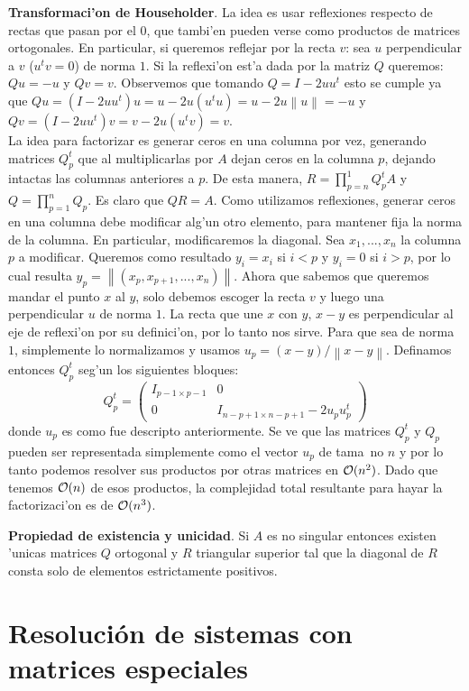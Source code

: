 \documentclass[a4paper,spanish]{article}
\newcommand{\norma}[1]{\left\|#1\right\|}
\newcommand{\Ode}[0]{{\cal O}}
\begin{document}
\textbf{Transformaci'on de Householder}. La idea es usar reflexiones respecto
de rectas que pasan por el $0$, que tambi'en pueden verse como productos de
matrices ortogonales. En particular, si queremos reflejar por la recta $v$:
sea $u$ perpendicular a $v$ ($u^tv = 0$) de norma $1$. Si la reflexi'on est'a
dada por la matriz $Q$ queremos: $Qu = -u$ y $Qv = v$. Observemos que tomando
$Q = I - 2uu^t$ esto se cumple ya que $Qu = (I-2uu^t)u = u - 2u(u^tu) = 
u - 2u \norma{u} = -u$ y $Qv = (I-2uu^t)v = v - 2u(u^tv) = v$. \\
La idea para factorizar es generar ceros en una columna por vez, generando
matrices $Q^t_p$ que al multiplicarlas por $A$ dejan ceros en la columna $p$,
dejando intactas las columnas anteriores a $p$. De esta manera, 
$R = \prod_{p=n}^1 Q^t_p A$ y $Q = \prod_{p=1}^n Q_p$. Es claro que $QR = A$.
Como utilizamos reflexiones, generar ceros en una columna debe modificar alg'un
otro elemento, para mantener fija la norma de la columna. En particular,
modificaremos la diagonal. Sea $x_1,...,x_n$ la columna $p$ a modificar.
Queremos como resultado $y_i=x_i$ si $i<p$ y $y_i=0$ si $i>p$, por lo cual
resulta $y_p = \norma{(x_p,x_{p+1},...,x_n)}$. Ahora que sabemos que queremos
mandar el punto $x$ al $y$, solo debemos escoger la recta $v$ y luego una
perpendicular $u$ de norma $1$. La recta que une $x$ con $y$, $x-y$ es
perpendicular al eje de reflexi'on por su definici'on, por lo tanto nos sirve.
Para que sea de norma $1$, simplemente lo normalizamos y usamos 
$u_p=(x-y)/\norma{x-y}$. Definamos entonces $Q^t_p$ seg'un los siguientes
bloques:
$$Q^t_p = \left(\begin{array}{cc}
I_{p-1 \times p-1} & 0 \\
0 & I_{n-p+1 \times n-p+1} - 2u_p u_p^t
\end{array}\right)$$
donde $u_p$ es como fue descripto anteriormente.
Se ve que las matrices $Q^t_p$ y $Q_p$ pueden ser representada simplemente 
como el vector $u_p$ de tama~no $n$ y por lo tanto podemos resolver sus
productos por otras matrices en $\Ode(n^2)$. Dado que tenemos $\Ode(n)$ de
esos productos, la complejidad total resultante para hayar la factorizaci'on
es de $\Ode(n^3)$.

\textbf{Propiedad de existencia y unicidad}. Si $A$ es no singular entonces
existen 'unicas matrices $Q$ ortogonal y $R$ triangular superior tal que
la diagonal de $R$ consta solo de elementos estrictamente positivos.

\section{Resoluci\'on de sistemas con matrices especiales}
\end{document}
